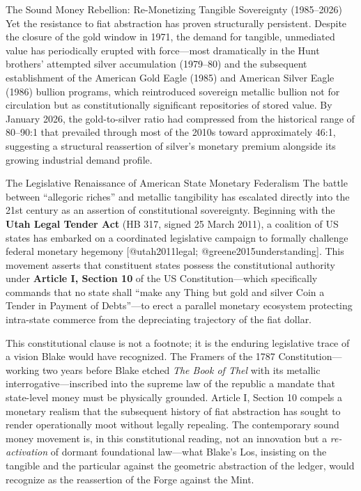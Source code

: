 \documentclass[
  ignorenonframetext,
]{beamer}
\author{\texorpdfstring{}{}}
\date{}
\begin{document}
\begin{frame}{The Sound Money Rebellion: Re-Monetizing Tangible
Sovereignty (1985--2026)}
\protect{}\label{the-sound-money-rebellion-re-monetizing-tangible-sovereignty-19852026}
Yet the resistance to fiat abstraction has proven structurally
persistent. Despite the closure of the gold window in 1971, the demand
for tangible, unmediated value has periodically erupted with
force---most dramatically in the Hunt brothers' attempted silver
accumulation (1979--80) and the subsequent establishment of the American
Gold Eagle (1985) and American Silver Eagle (1986) bullion programs,
which reintroduced sovereign metallic bullion not for circulation but as
constitutionally significant repositories of stored value. By January
2026, the gold-to-silver ratio had compressed from the historical range
of 80--90:1 that prevailed through most of the 2010s toward
approximately 46:1, suggesting a structural reassertion of silver's
monetary premium alongside its growing industrial demand profile.

\begin{block}{The Legislative Renaissance of American State Monetary
Federalism}
\protect{}\label{the-legislative-renaissance-of-american-state-monetary-federalism}
The battle between ``allegoric riches'' and metallic tangibility has
escalated directly into the 21st century as an assertion of
constitutional sovereignty. Beginning with the \textbf{Utah Legal Tender
Act} (HB 317, signed 25 March 2011), a coalition of US states has
embarked on a coordinated legislative campaign to formally challenge
federal monetary hegemony {[}@utah2011legal;
@greene2015understanding{]}. This movement asserts that constituent
states possess the constitutional authority under \textbf{Article I,
Section 10} of the US Constitution---which specifically commands that no
state shall ``make any Thing but gold and silver Coin a Tender in
Payment of Debts''---to erect a parallel monetary ecosystem protecting
intra-state commerce from the depreciating trajectory of the fiat
dollar.

This constitutional clause is not a footnote; it is the enduring
legislative trace of a vision Blake would have recognized. The Framers
of the 1787 Constitution---working two years before Blake etched
\emph{The Book of Thel} with its metallic interrogative---inscribed into
the supreme law of the republic a mandate that state-level money must be
physically grounded. Article I, Section 10 compels a monetary realism
that the subsequent history of fiat abstraction has sought to render
operationally moot without legally repealing. The contemporary sound
money movement is, in this constitutional reading, not an innovation but
a \emph{re-activation} of dormant foundational law---what Blake's Los,
insisting on the tangible and the particular against the geometric
abstraction of the ledger, would recognize as the reassertion of the
Forge against the Mint.


\end{block}
\end{frame}
\end{document}
